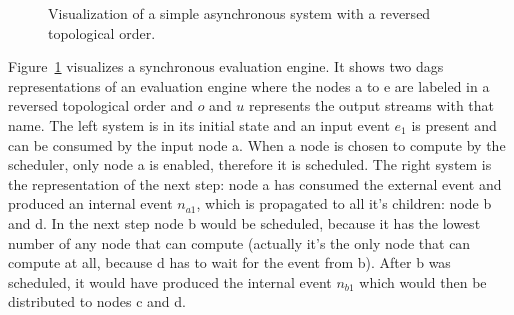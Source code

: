 \begin{figure}
  \caption{Visualization of a simple asynchronous system with a reversed topological order.}
\label{fig:chap3:sec_sync:visual_dag}
\end{figure}

Figure~\ref{fig:chap3:sec_sync:visual_dag} visualizes a synchronous evaluation engine.
It shows two \glspl{dag} representations of an evaluation engine  where the nodes a to e are labeled in a reversed topological order and \(o\) and \(u\) represents the output streams with that name.
The left system is in its initial state and an input event \(e_1\) is present and can be consumed by the input node a.
When a node is chosen to compute by the scheduler, only node a is enabled, therefore it is scheduled.
The right system is the representation of the next step: node a has consumed the external event and produced an internal event \(n_{a1}\), which is propagated to all it's children: node b and d.
In the next step node b would be scheduled, because it has the lowest number of any node that can compute (actually it's the only node that can compute at all, because d has to wait for the event from b).
After b was scheduled, it would have produced the internal event \(n_{b1}\) which would then be distributed to nodes c and d.

